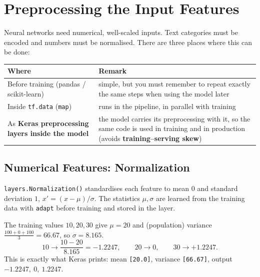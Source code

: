 \section{Preprocessing the Input Features}

Neural networks need numerical, well-scaled inputs. Text categories must be encoded and numbers must be normalised. There are three places where this can be done:

\begin{center}
\begin{tabular}{@{}p{4.1cm}p{9.2cm}@{}}
\toprule
\textbf{Where} & \textbf{Remark}\\
\midrule
Before training (pandas / scikit-learn) & simple, but you must remember to repeat exactly the same steps when using the model later\\
Inside \texttt{tf.data} (\texttt{map}) & runs in the pipeline, in parallel with training\\
As \textbf{Keras preprocessing layers inside the model} & the model carries its preprocessing with it, so the same code is used in training and in production (avoids \textbf{training--serving skew})\\
\bottomrule
\end{tabular}
\end{center}

\subsection{Numerical Features: Normalization}

\begin{definition}
\texttt{layers.Normalization()} standardises each feature to mean $0$ and standard deviation $1$, $x'=(x-\mu)/\sigma$. The statistics $\mu,\sigma$ are learned from the training data with \texttt{adapt} before training and stored in the layer.
\end{definition}

\begin{example}
The training values $10,20,30$ give $\mu=20$ and (population) variance $\frac{100+0+100}{3}=66.67$, so $\sigma=8.165$.
\[
  10\to\frac{10-20}{8.165}=-1.2247,\qquad 20\to0,\qquad 30\to+1.2247 .
\]
This is exactly what Keras prints: mean \texttt{[20.0]}, variance \texttt{[66.67]}, output $-1.2247,\ 0,\ 1.2247$.
\end{example}

